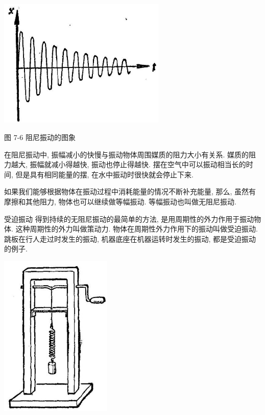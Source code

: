 \documentclass[10pt]{article}
\begin{document}
\begin{center}
\includegraphics[max width=0.6\textwidth]{images/01912d55-147c-70aa-b0e0-1782a122f948_201_607138.jpg}
\end{center}

图 7-6 阻尼振动的图象

在阻尼振动中, 振幅减小的快慢与振动物体周围媒质的阻力大小有关系. 媒质的阻力越大, 振幅就减小得越快, 振动也停止得越快. 摆在空气中可以振动相当长的时间, 但是具有相同能量的摆, 在水中振动时很快就会停止下来.

如果我们能够根据物体在振动过程中消耗能量的情况不断补充能量, 那么, 虽然有摩擦和其他阻力, 物体也可以继续做等幅振动. 等幅振动也叫做无阻尼振动.

受迫振动 得到持续的无阻尼振动的最简单的方法, 是用周期性的外力作用于振动物体. 这种周期性的外力叫做策动力. 物体在周期性外力作用下的振动叫做受迫振动. 跳板在行人走过时发生的振动, 机器底座在机器运转时发生的振动, 都是受迫振动的例子.

\begin{center}
\includegraphics[max width=0.4\textwidth]{images/01912d55-147c-70aa-b0e0-1782a122f948_201_184316.jpg}
\end{center}
\end{document}
